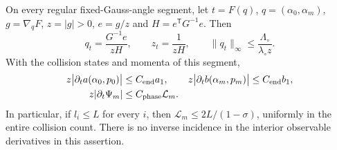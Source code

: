\begin{lemma}
\label{lem:wo-derivatives}
On every regular fixed-Gauss-angle segment, let $t=F(q)$,
$q=(\alpha_0,\alpha_m)$, $g=\nabla_qF$, $z=|g|>0$,
$e=g/z$ and $H=e^{\mathsf T}G^{-1}e$.  Then
\begin{equation}\label{eq:wo-gauss}
 q_t=\frac{G^{-1}e}{zH},\qquad
 z_t=\frac1{zH},\qquad
 \|q_t\|_\infty\le\frac{\Lambda_\circ}{\lambda_\circ z}.
\end{equation}
With the collision states and momenta of this segment,
\begin{align}
 z\bigl|\partial_t a(\alpha_0,p_0)\bigr|
       &\le C_{\rm end}a_1,
 &z\bigl|\partial_t b(\alpha_m,p_m)\bigr|
       &\le C_{\rm end}b_1,                        \label{eq:wo-endpoint-derivative}\\
 z|\partial_t\Psi_m|&\le C_{\rm phase}\mathcal L_m.
                                                        \label{eq:wo-phase-derivative}
\end{align}
In particular, if $l_i\le L$ for every $i$, then
$\mathcal L_m\le2L/(1-\sigma)$, uniformly in the entire collision
count.  There is no inverse incidence in the interior observable
derivatives in this assertion.
\end{lemma}
